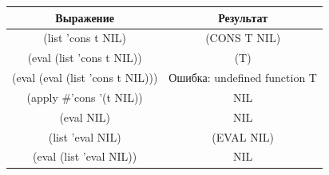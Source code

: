 \begin{table}[ht]
	\begin{center}
		\begin{tabular}{|c|c|}
			\hline
			\textbf{Выражение} & \textbf{Результат} \\
			\hline
			(list 'cons t NIL) & (CONS T NIL)   \\
			\hline
			(eval (list 'cons t NIL)) & (T) \\
			\hline
			(eval (eval (list 'cons t NIL))) & Ошибка: undefined function T \\
			\hline
			(apply \#'cons '(t NIL)) & NIL \\
			\hline
			(eval NIL) & NIL \\
			\hline
			(list 'eval NIL) & (EVAL NIL) \\
			\hline
			(eval (list 'eval NIL)) & NIL \\
			\hline
		\end{tabular}
	\end{center}
\end{table}